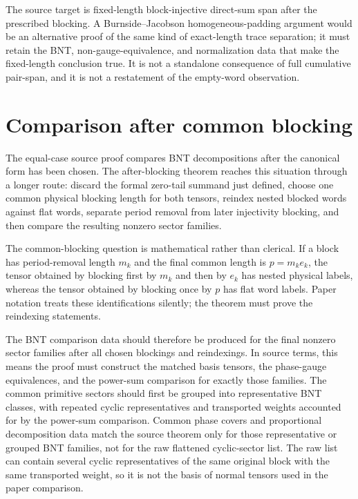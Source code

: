 \documentclass{article}
\begin{document}
The source target is fixed-length block-injective direct-sum span after the
prescribed blocking. A Burnside--Jacobson homogeneous-padding argument would be
an alternative proof of the same kind of exact-length trace separation; it must
retain the BNT, non-gauge-equivalence, and normalization data that make the
fixed-length conclusion true. It is not a standalone consequence of full
cumulative pair-span, and it is not a restatement of the empty-word observation.

\section{Comparison after common blocking}

The equal-case source proof compares BNT decompositions after the canonical form
has been chosen. The after-blocking theorem reaches this situation through a
longer route: discard the formal zero-tail summand just defined, choose one
common physical blocking length for both tensors, reindex nested blocked words
against flat words, separate period removal from later injectivity blocking, and
then compare the resulting nonzero sector families.

The common-blocking question is mathematical rather than clerical. If a block has
period-removal length $m_k$ and the final common length is $p=m_ke_k$, the
tensor obtained by blocking first by $m_k$ and then by $e_k$ has nested
physical labels, whereas the tensor obtained by blocking once by $p$ has flat
word labels. Paper notation treats these identifications silently; the
theorem must prove the reindexing statements.

The BNT comparison data should therefore be produced for the final nonzero
sector families after all chosen blockings and reindexings. In source terms,
this means the proof must construct the matched basis tensors, the phase-gauge
equivalences, and the power-sum comparison for exactly those families. The
common primitive sectors should first be grouped into representative BNT
classes, with repeated cyclic representatives and transported weights accounted
for by the power-sum comparison. Common phase covers and proportional
decomposition data match the source theorem only for those representative or
grouped BNT families, not for the raw flattened cyclic-sector list. The raw list
can contain several cyclic representatives of the same original block with the
same transported weight, so it is not the basis of normal tensors used in the
paper comparison.
\end{document}
